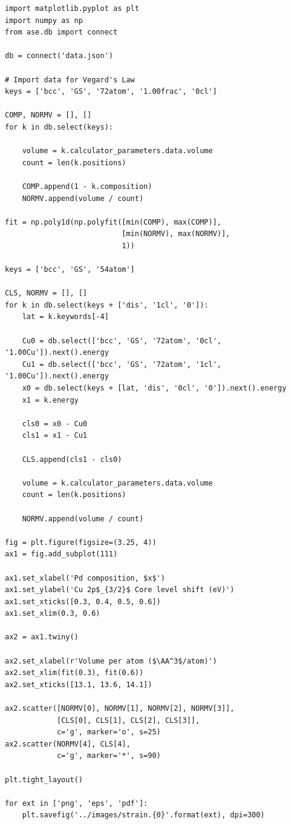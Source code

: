 \documentclass[number, sort&compress, review, 12pt]{elsarticle}
\begin{document}
\begin{verbatim}
import matplotlib.pyplot as plt
import numpy as np
from ase.db import connect

db = connect('data.json')

# Import data for Vegard's Law
keys = ['bcc', 'GS', '72atom', '1.00frac', '0cl']

COMP, NORMV = [], []
for k in db.select(keys):

    volume = k.calculator_parameters.data.volume
    count = len(k.positions)

    COMP.append(1 - k.composition)
    NORMV.append(volume / count)

fit = np.poly1d(np.polyfit([min(COMP), max(COMP)],
                           [min(NORMV), max(NORMV)],
                           1))

keys = ['bcc', 'GS', '54atom']

CLS, NORMV = [], []
for k in db.select(keys + ['dis', '1cl', '0']):
    lat = k.keywords[-4]

    Cu0 = db.select(['bcc', 'GS', '72atom', '0cl', '1.00Cu']).next().energy
    Cu1 = db.select(['bcc', 'GS', '72atom', '1cl', '1.00Cu']).next().energy
    x0 = db.select(keys + [lat, 'dis', '0cl', '0']).next().energy
    x1 = k.energy

    cls0 = x0 - Cu0
    cls1 = x1 - Cu1

    CLS.append(cls1 - cls0)

    volume = k.calculator_parameters.data.volume
    count = len(k.positions)

    NORMV.append(volume / count)

fig = plt.figure(figsize=(3.25, 4))
ax1 = fig.add_subplot(111)

ax1.set_xlabel('Pd composition, $x$')
ax1.set_ylabel('Cu 2p$_{3/2}$ Core level shift (eV)')
ax1.set_xticks([0.3, 0.4, 0.5, 0.6])
ax1.set_xlim(0.3, 0.6)

ax2 = ax1.twiny()

ax2.set_xlabel(r'Volume per atom ($\AA^3$/atom)')
ax2.set_xlim(fit(0.3), fit(0.6))
ax2.set_xticks([13.1, 13.6, 14.1])

ax2.scatter([NORMV[0], NORMV[1], NORMV[2], NORMV[3]],
            [CLS[0], CLS[1], CLS[2], CLS[3]],
            c='g', marker='o', s=25)
ax2.scatter(NORMV[4], CLS[4],
            c='g', marker='*', s=90)

plt.tight_layout()

for ext in ['png', 'eps', 'pdf']:
    plt.savefig('../images/strain.{0}'.format(ext), dpi=300)
\end{verbatim}
\end{document}
